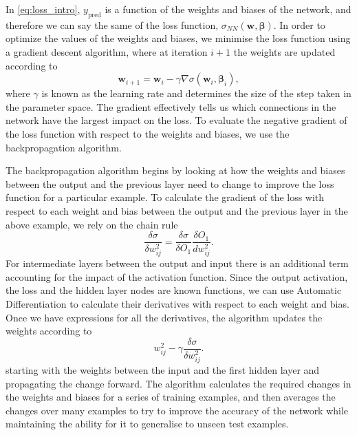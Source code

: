 In \cref{eq:loss_intro}, $y_\mathrm{pred}$ is a function of the weights and biases of the network, and therefore we can say the same of the loss function, $\sigma_{NN}(\mathbf{w}, \mathbf{\beta})$. In order to optimize the values of the weights and biases, we minimise the loss function using a gradient descent algorithm, where at iteration $i+1$ the weights are updated according to
\begin{equation}
    \mathbf{w}_{i+1} = \mathbf{w}_i - \gamma \nabla \sigma(\mathbf{w}_i, \mathbf{\beta}_i),
\end{equation}
where $\gamma$ is known as the learning rate and determines the size of the step taken in the parameter space. The gradient effectively tells us which connections in the network have the largest impact on the loss. To evaluate the negative gradient of the loss function with respect to the weights and biases, we use the backpropagation algorithm.

The backpropagation algorithm begins by looking at how the weights and biases between the output and the previous layer need to change to improve the loss function for a particular example. To calculate the gradient of the loss with respect to each weight and bias between the output and the previous layer in the above example, we rely on the chain rule
\begin{equation}
    \frac{\delta \sigma}{\delta w^2_{ij}} = \frac{\delta \sigma}{\delta O_1} \frac{\delta O_1}{d w^2_{ij}}.
\end{equation}
For intermediate layers between the output and input there is an additional term accounting for the impact of the activation function. Since the output activation, the loss and the hidden layer nodes are known functions, we can use Automatic Differentiation to calculate their derivatives with respect to each weight and bias. Once we have expressions for all the derivatives, the algorithm updates the weights according to
\begin{equation}
    w^2_{ij} - \gamma \frac{\delta \sigma}{\delta w^2_{ij}}.
\end{equation}
starting with the weights between the input and the first hidden layer and propagating the change forward.
The algorithm calculates the required changes in the weights and biases for a series of training examples, and then averages the changes over many examples to try to improve the accuracy of the network while maintaining the ability for it to generalise to unseen test examples. 

